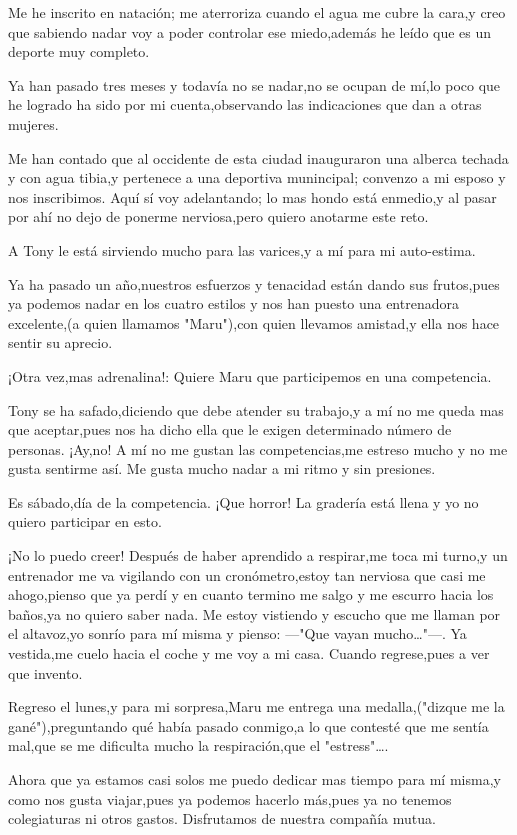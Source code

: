 \documentclass[letterpaper,12pt]{book}
\begin{document}
Me he inscrito en natación; me aterroriza cuando el agua me cubre la cara,y creo que sabiendo nadar voy a poder controlar ese miedo,además he leído que es un deporte muy completo.

Ya han pasado tres meses y todavía no se nadar,no se ocupan de mí,lo poco que he logrado ha sido por mi cuenta,observando las indicaciones que dan a otras mujeres.

Me han contado que al occidente de esta ciudad inauguraron una alberca techada y con agua tibia,y pertenece a una deportiva munincipal; convenzo a mi esposo y nos inscribimos. Aquí sí voy adelantando; lo mas hondo está enmedio,y al pasar por ahí no dejo de ponerme nerviosa,pero quiero anotarme este reto.

A Tony le está sirviendo mucho para las varices,y a mí para mi auto-estima.

Ya ha pasado un año,nuestros esfuerzos y tenacidad están dando sus frutos,pues ya podemos nadar en los cuatro estilos y nos han puesto una entrenadora excelente,(a quien llamamos "Maru"),con quien llevamos amistad,y ella nos hace sentir su aprecio.

¡Otra vez,mas adrenalina!: Quiere Maru que participemos en una competencia.

Tony se ha safado,diciendo que debe atender su trabajo,y a mí no me queda mas que aceptar,pues nos ha dicho ella que le exigen determinado número de personas. ¡Ay,no! A mí no me gustan las competencias,me estreso mucho y no me gusta sentirme así. Me gusta mucho nadar a mi ritmo y sin presiones.

Es sábado,día de la competencia. ¡Que horror! La gradería está llena y yo no quiero participar en esto. 

¡No lo puedo creer! Después de haber aprendido a respirar,me toca mi turno,y un entrenador me va vigilando con un cronómetro,estoy tan nerviosa que casi me ahogo,pienso que ya perdí y en cuanto termino me salgo y me escurro hacia los baños,ya no quiero saber nada. Me estoy vistiendo y escucho que me llaman por el altavoz,yo  sonrío para mí misma y pienso: ---"Que vayan mucho\ldots"---.  Ya vestida,me cuelo hacia el coche y me voy a mi casa. Cuando regrese,pues a ver que invento.

Regreso el lunes,y para mi sorpresa,Maru me entrega una medalla,("dizque me la gané"),preguntando qué había pasado conmigo,a lo que contesté que me sentía mal,que se me dificulta mucho la respiración,que el "estress"\ldots.

Ahora que ya estamos casi solos me puedo dedicar mas tiempo para mí misma,y como nos gusta viajar,pues ya podemos hacerlo más,pues ya no tenemos colegiaturas ni otros gastos. Disfrutamos de nuestra compañía mutua.
\end{document}
